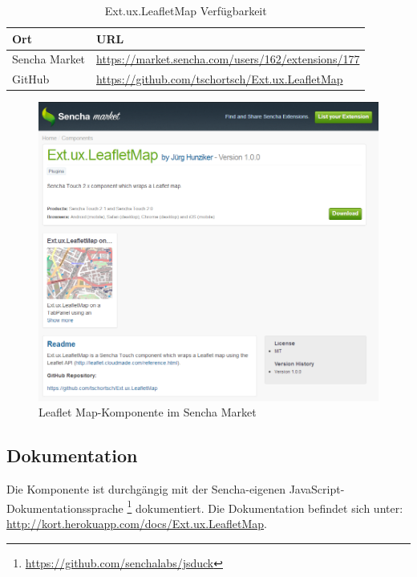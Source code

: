 \begin{table}[H]
\centering
\begin{tabular}{|p{0.2\twocelltabwidth}|p{0.8\twocelltabwidth}|}
\hline 
\textbf{Ort} & \textbf{URL} \\ 
\hline 
Sencha Market & \url{https://market.sencha.com/users/162/extensions/177} \\ 
\hline 
GitHub & \url{https://github.com/tschortsch/Ext.ux.LeafletMap} \\ 
\hline 
\end{tabular} 
\caption{Ext.ux.LeafletMap Verfügbarkeit}
\label{leafletmap-availiblity}
\end{table}

\begin{figure}[H]
	\centering
	\includegraphics[scale=0.6]{images/implementation/frontend/leafletmap-sencha-market}
	\caption{Leaflet Map-Komponente im Sencha Market}
	\label{image-leafletmap-sencha-market}
\end{figure}

\subsection{Dokumentation}
Die Komponente ist durchgängig mit der Sencha-eigenen JavaScript-Dokumentationssprache \footnote{\url{https://github.com/senchalabs/jsduck}} dokumentiert. Die Dokumentation befindet sich unter: \url{http://kort.herokuapp.com/docs/Ext.ux.LeafletMap}.
